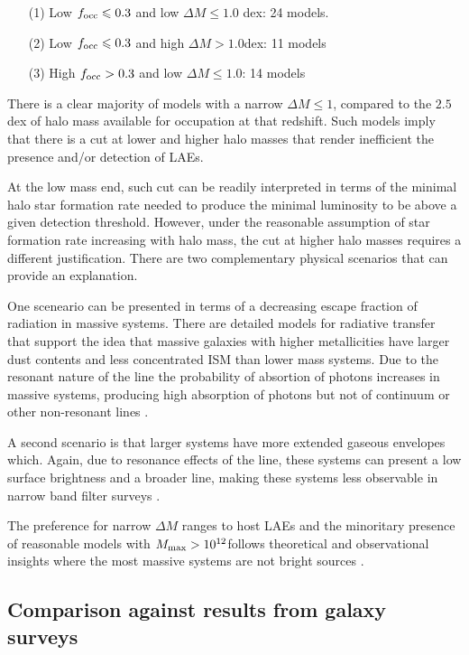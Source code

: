 \documentclass[usenatbib]{mn2e}
\newcommand{\ly}{{\ifmmode{{\rm Ly}\alpha}\else{Ly$\alpha$~}\fi}}
\newcommand{\hMsun}{{\ifmmode{h^{-1}{\rm
        {M_{\odot}}}}\else{$h^{-1}{\rm{M_{\odot}}}$}\fi}}
\begin{document}
\begin{itemize}
\item[(1)] Low $f_{\rm occ}\leq 0.3$ and low $\Delta M\leq 1.0$
  dex: 24 models.
\item[(2)] Low $f_{\rm occ}\leq 0.3$ and high $\Delta M > 1.0$dex: 11
  models
\item[(3)] High $f_{\rm occ}> 0.3$ and low $\Delta M\leq 1.0$: 14 models
\end{itemize}

There is a clear majority of models with a narrow $\Delta M\leq
1$, compared to the $2.5$dex of halo mass available for occupation at
that redshift. Such models imply that there is a cut at lower and higher halo
masses that render inefficient the presence and/or detection of LAEs.

At the low mass end, such cut can be readily interpreted in terms of the
minimal halo star formation rate needed to produce the minimal \ly 
luminosity to be above a given detection threshold.  However, under
the reasonable assumption of star formation rate increasing with halo
mass, the cut at higher halo masses requires a different
justification. There are two complementary physical scenarios that can
provide an explanation.

One sceneario can be presented in terms of a decreasing escape
fraction of \ly radiation in massive systems. There are detailed models for
radiative transfer that support the idea that massive galaxies with
higher metallicities have larger dust contents and less concentrated
ISM than lower mass systems. Due to the resonant nature of the
\ly line the probability of absortion  of \ly photons increases in
massive systems, producing high absorption of \ly photons but not of
continuum or other non-resonant lines
\citep{Laursen2009,ForeroRomero2011}. 

A second scenario is that larger systems have more extended gaseous
envelopes which. Again, due to resonance effects of the \ly line,
these systems can present a low surface brightness and a broader line,
making these systems less observable in narrow band filter surveys
\citep{Laursen2009,Zheng2010}.  

The preference for narrow $\Delta M$ ranges to host LAEs 
and the minoritary presence of reasonable models with $M_{\rm max}>
10^{12}$\hMsun follows theoretical and observational
insights where the most massive systems are not bright \ly sources
\citep{ForeroRomero2012,Shapley2003}. 

\subsection{Comparison against results from galaxy surveys}
\end{document}

